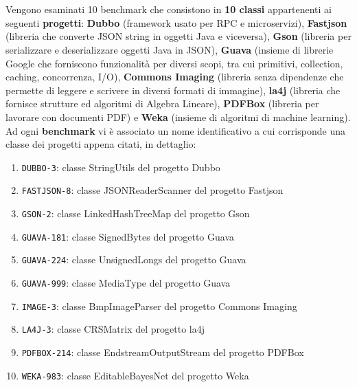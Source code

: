 \documentclass[a4paper, 12pt, oneside]{book}
\theoremstyle{normal}
\begin{document}
\\ \\ Vengono esaminati 10 benchmark che consistono in \textbf{10 classi} appartenenti ai seguenti \textbf{progetti}: \textbf{Dubbo} (framework usato per RPC e microservizi), \textbf{Fastjson} (libreria che converte JSON string in oggetti Java e viceversa), \textbf{Gson} (libreria per serializzare e deserializzare oggetti Java in JSON), \textbf{Guava} (insieme di librerie Google che forniscono funzionalità per diversi scopi, tra cui primitivi, collection, caching, concorrenza, I/O), \textbf{Commons Imaging} (libreria senza dipendenze che permette di leggere e scrivere in diversi formati di immagine), \textbf{la4j} (libreria che fornisce strutture ed algoritmi di Algebra Lineare), \textbf{PDFBox} (libreria per lavorare con documenti PDF) e \textbf{Weka} (insieme di algoritmi di machine learning).
\\ Ad ogni \textbf{benchmark} vi è associato un nome identificativo a cui corrisponde una classe dei progetti appena citati, in dettaglio:
\begin{enumerate}[itemsep=0pt, topsep=2pt]
    \item \verb|DUBBO-3|: classe StringUtils del progetto Dubbo
    \item \verb|FASTJSON-8|: classe JSONReaderScanner del progetto Fastjson
    \item \verb|GSON-2|: classe LinkedHashTreeMap del progetto Gson
    \item \verb|GUAVA-181|: classe SignedBytes del progetto Guava
    \item \verb|GUAVA-224|: classe UnsignedLongs del progetto Guava
    \item \verb|GUAVA-999|: classe MediaType del progetto Guava
    \item \verb|IMAGE-3|: classe BmpImageParser del progetto Commons Imaging
    \item \verb|LA4J-3|: classe CRSMatrix del progetto la4j
    \item \verb|PDFBOX-214|: classe EndstreamOutputStream del progetto PDFBox
    \item \verb|WEKA-983|: classe EditableBayesNet del progetto Weka
\end{enumerate}
\end{document}
